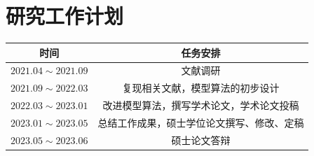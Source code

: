 \documentclass[degree=master,cjk-font=noto]{thuthesis}
\begin{document}
\chapter{研究工作计划}


\begin{table}[htb]
  \centering
  \label{tab:plan}
  \begin{tabular}{cc}
    \toprule
    \textbf{时间}         & \textbf{任务安排}  \\
    \midrule
    $2021.04 \sim 2021.09$ & 文献调研 \\
    $2021.09 \sim 2022.03$ & 复现相关文献，模型算法的初步设计 \\
    $2022.03 \sim 2023.01$ & 改进模型算法，撰写学术论文，学术论文投稿 \\
    $2023.01 \sim 2023.05$ & 总结工作成果，硕士学位论文撰写、修改、定稿\\
    $2023.05 \sim 2023.06$ & 硕士论文答辩 \\
    \bottomrule
  \end{tabular}
\end{table}

\backmatter


\appendix
\end{document}
